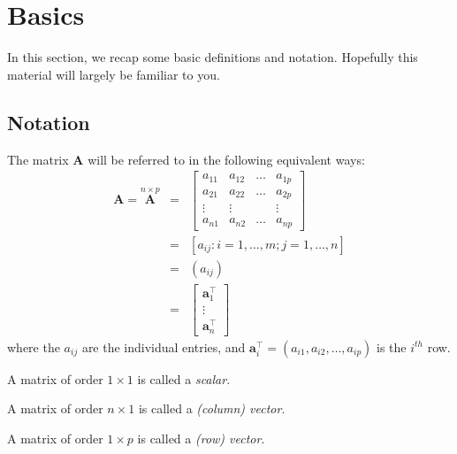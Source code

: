 \documentclass[]{book}
\theoremstyle{definition}
\theoremstyle{definition}
\theoremstyle{definition}
\theoremstyle{remark}
\begin{document}
\renewcommand{\bs}{\boldsymbol}
\renewcommand{\ds}{\displaystyle}
\renewcommand{\tdiag}{\text{diag}}
\renewcommand{\ttr}{\text{tr}}
\renewcommand{\tdet}{\text{det}}

\renewcommand{\tcov}{\text{cov}}
\renewcommand{\texp}{\text{exp}}
\renewcommand{\lb}{\left(}
\renewcommand{\rb}{\right)}
\renewcommand{\lsb}{\left[}
\renewcommand{\rsb}{\right]}

\hypertarget{linalg-basics}{%
\section{Basics}\label{linalg-basics}}

In this section, we recap some basic definitions and notation. Hopefully this material will largely be familiar to you.

\hypertarget{notation}{%
\subsection{Notation}\label{notation}}

The matrix \({\mathbf A}\) will be referred to in the following equivalent ways:
\begin{eqnarray*}
{\mathbf A}=\stackrel{n\times p}{\mathbf A} &=& \left[\begin{array}{cccc}
a_{11}&a_{12}&\dots&a_{1p}\\
a_{21}&a_{22}&\dots&a_{2p}\\
\vdots&\vdots&&\vdots\\
a_{n1}&a_{n2}&\dots&a_{np}
\end{array} \right] \\
&=&[a_{ij}: i=1, \ldots , m; j=1, \ldots , n]\\
&=&(a_{ij})\\
&=& \left[ \begin{array}{c}\boldsymbol a_1^\top\\
\vdots\\
\boldsymbol a_n^\top\end{array}\right]
\end{eqnarray*}
where the \(a_{ij}\) are the individual entries, and \(\boldsymbol a_i^\top=(a_{i1}, a_{i2}, \ldots, a_{ip})\) is the \(i^{th}\) row.

A matrix of order \(1\times 1\) is called a \emph{scalar}.

A matrix of order \(n\times 1\) is called a \emph{(column) vector}.

A matrix of order \(1\times p\) is called a \emph{(row) vector}.
\end{document}
